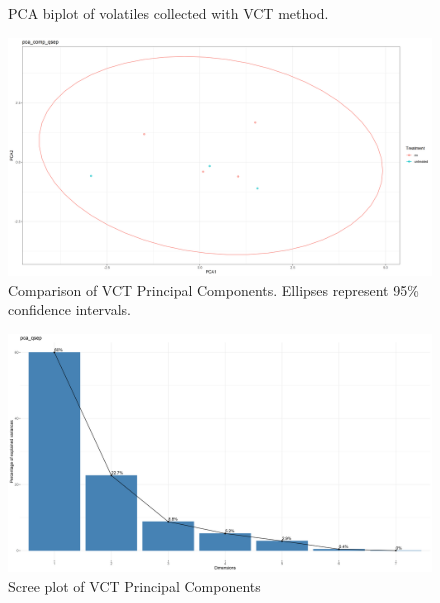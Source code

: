 \documentclass[12pt,final,CPage]{ufthesis}
\begin{document}
{\begin{figure}
  \caption{PCA biplot of volatiles collected with VCT method.}\label{fig:qsep-vocs}
  \end{figure}
  \begin{figure}

  {\centering \includegraphics[width=1\linewidth]{figure/rrv_volatiles_comparison_pca_comp_qsep} 

  }

  \caption{Comparison of VCT Principal Components. Ellipses represent 95\% confidence intervals.}\label{fig:qsep-vocs-compares}
  \end{figure}
  \begin{figure}

  {\centering \includegraphics[width=1\linewidth]{figure/rrv_volatiles_screeplot_pca_qsep} 

  }

  \caption{Scree plot of VCT Principal Components}\label{fig:qsep-vocs-scree}
  \end{figure}
  \begin{figure}


\end{figure}}
\end{document}
